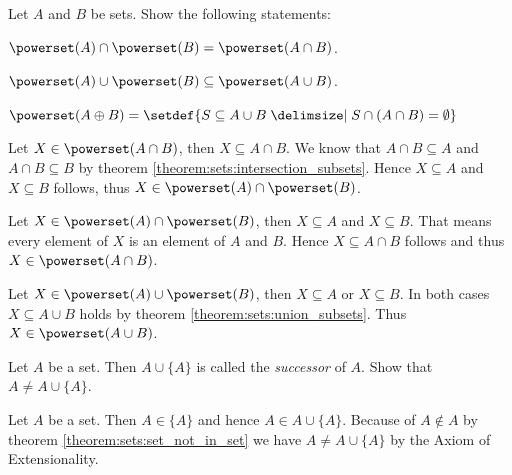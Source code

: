 \begin{exercise}[Powersets]
    Let $A$ and $B$ be sets. Show the following statements:
    \begin{exerciseenumerate}
        \item $\powerset(A)\cap\powerset(B)=\powerset(A\cap B)$.
        \item $\powerset(A)\cup\powerset(B)\subseteq\powerset(A\cup B)$.
        \item $\powerset(A\oplus B)=\setdef{S\subseteq A\cup B\given S\cap (A\cap B)=\emptyset}$
    \end{exerciseenumerate}
\end{exercise}

\begin{solution}
    \begin{solutionenumerate}
        \item \proofsubset Let $X\in\powerset(A\cap B)$, then $X\subseteq A\cap B$. We know that $A\cap B\subseteq A$ and $A\cap B\subseteq B$ by theorem \ref{theorem:sets:intersection_subsets}. Hence $X\subseteq A$ and $X\subseteq B$ follows, thus $X\in\powerset(A)\cap\powerset(B)$.
        
        \proofsupset Let $X\in\powerset(A)\cap\powerset(B)$, then $X\subseteq A$ and $X\subseteq B$. That means every element of $X$ is an element of $A$ and $B$. Hence $X\subseteq A\cap B$ follows and thus $X\in\powerset(A\cap B)$.

        \item Let $X\in\powerset(A)\cup\powerset(B)$, then $X\subseteq A$ or $X\subseteq B$. In both cases $X\subseteq A\cup B$ holds by theorem \ref{theorem:sets:union_subsets}. Thus $X\in\powerset(A\cup B)$.
    \end{solutionenumerate}
\end{solution}


\begin{exercise}[Successor]
    Let $A$ be a set. Then $A\cup\{A\}$ is called the \emph{successor} of $A$. Show that $A\neq A\cup\{A\}$.
\end{exercise}
\begin{solution}
    Let $A$ be a set. Then $A\in\{A\}$ and hence $A\in A\cup\{A\}$. Because of $A\notin A$ by theorem \ref{theorem:sets:set_not_in_set} we have $A\neq A\cup\{A\}$ by the Axiom of Extensionality.
\end{solution}

